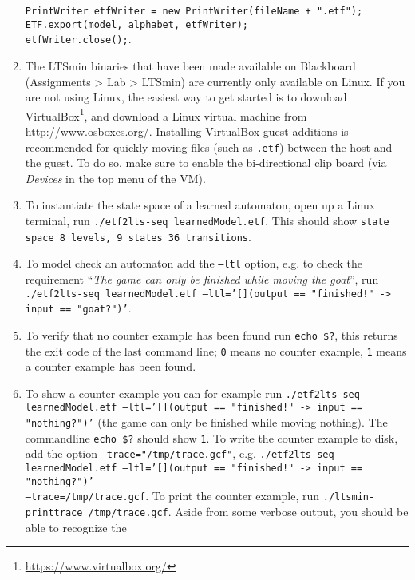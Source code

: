 \documentclass[a4paper]{article}
\begin{document}
\begin{enumerate}
               \texttt{PrintWriter etfWriter = new PrintWriter(fileName + ".etf"); \\
                       ETF.export(model, alphabet, etfWriter); \\
                       etfWriter.close();}.
     \item     The LTSmin binaries that have been made available on Blackboard (Assignments \textgreater{} Lab \textgreater{} LTSmin) are currently only available on Linux.
               If you are not using Linux, the easiest way to get started is to download VirtualBox\footnote{\url{https://www.virtualbox.org/}}, and download a Linux virtual
               machine from \url{http://www.osboxes.org/}. Installing VirtualBox guest additions is recommended for quickly moving files (such as \texttt{.etf}) between the host and the guest.
               To do so, make sure to enable the bi-directional clip board (via \emph{Devices} in the top menu of the VM).
     \item     To instantiate the state space of a learned automaton, open up a Linux terminal, run \texttt{./etf2lts-seq learnedModel.etf}.
               This should show \texttt{state space 8 levels, 9 states 36 transitions}.
     \item     To model check an automaton add the \texttt{--ltl} option, e.g. to check the requirement ``\emph{The game can only be finished while moving the goat}'', run
               \texttt{./etf2lts-seq learnedModel.etf --ltl='[](output == "finished!" -> input == "goat?")'}.
     \item     To verify that no counter example has been found run \texttt{echo \$?}, this returns the exit code of the last command line; \texttt{0} means
               no counter example, \texttt{1} means a counter example has been found.
     \item     To show a counter example you can for example run \texttt{./etf2lts-seq learnedModel.etf --ltl='[](output == "finished!" -> input == "nothing?")'}
               (the game can only be finished while moving nothing). The commandline \texttt{echo \$?} should show \texttt{1}. To write the counter example
               to disk, add the option \texttt{--trace="/tmp/trace.gcf"}, 
               e.g. \texttt{./etf2lts-seq learnedModel.etf --ltl='[](output == "finished!" -> input == "nothing?")' \\ --trace=/tmp/trace.gcf}.
               To print the counter example, run \texttt{./ltsmin-printtrace /tmp/trace.gcf}. Aside from some verbose output, you should be able to recognize the

\end{enumerate}
\end{document}
